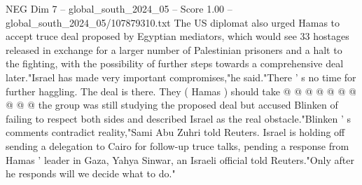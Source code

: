 \begin{textsample}{NEG Dim 7 – global\_south\_2024\_05 – Score 1.00 – global\_south\_2024\_05/107879310.txt}
The US diplomat also urged Hamas to accept truce deal proposed by Egyptian mediators, which would see 33 hostages released in exchange for a larger number of Palestinian prisoners and a halt to the fighting, with the possibility of further steps towards a comprehensive deal later."Israel has made very important compromises,"he said."There ' s no time for further haggling.
The deal is there.
They ( Hamas ) should take @ @ @ @ @ @ @ @ @ @ the group was still studying the proposed deal but accused Blinken of failing to respect both sides and described Israel as the real obstacle."Blinken ' s comments contradict reality,"Sami Abu Zuhri told Reuters.
Israel is holding off sending a delegation to Cairo for follow-up truce talks, pending a response from Hamas ' leader in Gaza, Yahya Sinwar, an Israeli official told Reuters."Only after he responds will we decide what to do."

\end{textsample}
